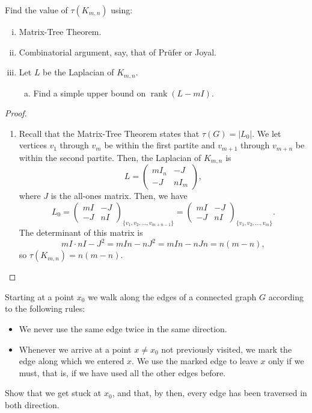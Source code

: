 \documentclass[11pt]{article}
\begin{document}
\begin{quest}
    Find the value of $\tau(K_{m,n})$ using:
    \begin{enumerate}[(i)]
        \item Matrix-Tree Theorem.
        \item Combinatorial argument, say, that of Prüfer or Joyal.
        \item Let $L$ be the Laplacian of $K_{m,n}$.
            \begin{enumerate}[(a)]
                \item Find a simple upper bound on $\mathop{\mathrm{rank}}(L-mI)$.
            \end{enumerate}
    \end{enumerate}
\end{quest}
\begin{proof}
    \begin{enumerate}
        \item Recall that the Matrix-Tree Theorem states that $\tau(G) = |L_0|$. We let vertices $v_1$ through $v_m$ be within the first partite and $v_{m+1}$ through $v_{m+n}$ be within the second partite. Then, the Laplacian of $K_{m,n}$ is \[L=\begin{pmatrix}mI_n&-J\\-J&nI_m\end{pmatrix},\] where $J$ is the all-ones matrix. Then, we have \[L_0=\begin{pmatrix}mI&-J\\-J&nI\end{pmatrix}_{\{v_1,v_2,\dots,v_{m+n-1}\}}=\begin{pmatrix}mI&-J\\-J&nI\end{pmatrix}_{\{v_1,v_2,\dots,v_m\}}.\] The determinant of this matrix is \[mI\cdot nI-J^2=mIn-nJ^2=mIn-nJn=n(m-n),\] so $\tau(K_{m,n})=n(m-n)$.
    \end{enumerate}
\end{proof}
\setcounter{problem}{3}
\begin{quest}
    Starting at a point $x_0$ we walk along the edges of a connected graph $G$ according to the following rules:
    \begin{itemize}
        \item We never use the same edge twice in the same direction.
        \item Whenever we arrive at a point $x\neq x_0$ not previously visited, we mark the edge along which we entered $x$. We use the marked edge to leave $x$ only if we must, that is, if we have used all the other edges before.
    \end{itemize}
    Show that we get stuck at $x_0$, and that, by then, every edge has been traversed in both direction.
\end{quest}
\end{document}
